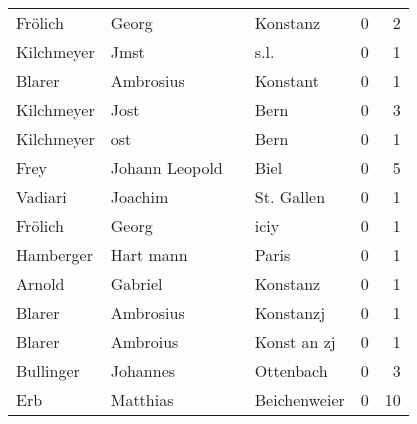 \begin{tabular}{llllrr}
                  Frölich &                              Georg &             &                                    Konstanz &          0 &         2 \\
               Kilchmeyer &                               Jmst &             &                                        s.l. &          0 &         1 \\
                   Blarer &                          Ambrosius &             &                                    Konstant &          0 &         1 \\
               Kilchmeyer &                               Jost &             &                                        Bern &          0 &         3 \\
               Kilchmeyer &                                ost &             &                                        Bern &          0 &         1 \\
                     Frey &                     Johann Leopold &             &                                        Biel &          0 &         5 \\
                  Vadiari &                            Joachim &             &                                  St. Gallen &          0 &         1 \\
                  Frölich &                              Georg &             &                                        iciy &          0 &         1 \\
                Hamberger &                          Hart mann &             &                                       Paris &          0 &         1 \\
                   Arnold &                            Gabriel &             &                                    Konstanz &          0 &         1 \\
                   Blarer &                          Ambrosius &             &                                   Konstanzj &          0 &         1 \\
                   Blarer &                           Ambroius &             &                                 Konst an zj &          0 &         1 \\
                Bullinger &                           Johannes &             &                                   Ottenbach &          0 &         3 \\
                      Erb &                           Matthias &             &                                Beichenweier &          0 &        10 \\

\end{tabular}

